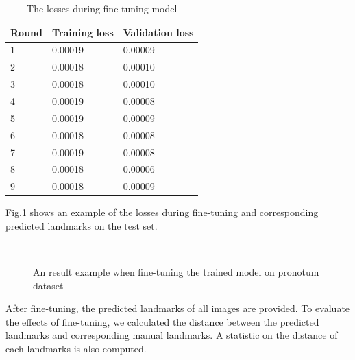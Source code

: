 \documentclass[12pt,a4paper]{article}
\begin{document}
\begin{table}[h!]
	\centering
	\begin{tabular}{l l l}
	Round & Training loss & Validation loss \\ \hline
	1 & 0.00019 & 0.00009  \\ \hline
	2 & 0.00018 & 0.00010 \\ \hline
	3 & 0.00018 & 0.00010 \\ \hline
	4 & 0.00019 & 0.00008 \\ \hline
	5 & 0.00019 & 0.00009 \\ \hline
	6 & 0.00018 & 0.00008 \\ \hline
	7 & 0.00019 & 0.00008 \\ \hline
	8 & 0.00018 & 0.00006 \\ \hline
	9 & 0.00018 & 0.00009 \\ \hline
	\end{tabular}
	\caption{The losses during fine-tuning model}
	\label{finetuningloss}
\end{table}

Fig.\ref{figfintuning} shows an example of the losses during fine-tuning and corresponding predicted landmarks on the test set.

\begin{figure}[h!]
\centering
{}~~
\caption{An result example when fine-tuning the trained model on pronotum dataset}
\label{figfintuning}
\end{figure}
After fine-tuning, the predicted landmarks of all images are provided. To evaluate the effects of fine-tuning, we calculated the distance between the predicted landmarks and corresponding manual landmarks. A statistic on the distance of each landmarks is also computed. 
\end{document}
